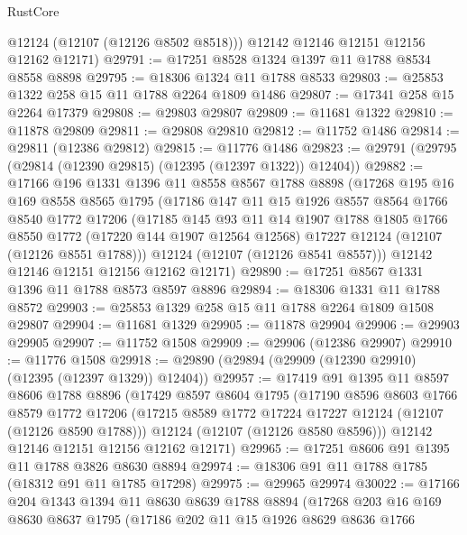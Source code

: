 \begin{lexlean}{RustCore}
\begin{coremodule}
        @12124
        (@12107 (@12126 @8502 @8518)))
      @12142
      @12146
      @12151
      @12156
      @12162
      @12171)
@29791 := @17251 @8528 @1324 @1397 @11 @1788 @8534 @8558 @8898
@29795 := @18306 @1324 @11 @1788 @8533
@29803 := @25853 @1322 @258 @15 @11 @1788 @2264 @1809 @1486
@29807 := @17341 @258 @15 @2264 @17379
@29808 := @29803 @29807
@29809 := @11681 @1322
@29810 := @11878 @29809
@29811 := @29808 @29810
@29812 := @11752 @1486
@29814 := @29811 (@12386 @29812)
@29815 := @11776 @1486
@29823 := @29791 (@29795 (@29814 (@12390 @29815) (@12395 (@12397 @1322)) @12404))
@29882 := @17166
    @196
    @1331
    @1396
    @11
    @8558
    @8567
    @1788
    @8898
    (@17268
      @195
      @16
      @169
      @8558
      @8565
      @1795
      (@17186
        @147
        @11
        @15
        @1926
        @8557
        @8564
        @1766
        @8540
        @1772
        @17206
        (@17185
          @145
          @93
          @11
          @14
          @1907
          @1788
          @1805
          @1766
          @8550
          @1772
          (@17220 @144 @1907 @12564 @12568)
          @17227
          @12124
          (@12107 (@12126 @8551 @1788)))
        @12124
        (@12107 (@12126 @8541 @8557)))
      @12142
      @12146
      @12151
      @12156
      @12162
      @12171)
@29890 := @17251 @8567 @1331 @1396 @11 @1788 @8573 @8597 @8896
@29894 := @18306 @1331 @11 @1788 @8572
@29903 := @25853 @1329 @258 @15 @11 @1788 @2264 @1809 @1508 @29807
@29904 := @11681 @1329
@29905 := @11878 @29904
@29906 := @29903 @29905
@29907 := @11752 @1508
@29909 := @29906 (@12386 @29907)
@29910 := @11776 @1508
@29918 := @29890 (@29894 (@29909 (@12390 @29910) (@12395 (@12397 @1329)) @12404))
@29957 := @17419
    @91
    @1395
    @11
    @8597
    @8606
    @1788
    @8896
    (@17429
      @8597
      @8604
      @1795
      (@17190
        @8596
        @8603
        @1766
        @8579
        @1772
        @17206
        (@17215 @8589 @1772 @17224 @17227 @12124 (@12107 (@12126 @8590 @1788)))
        @12124
        (@12107 (@12126 @8580 @8596)))
      @12142
      @12146
      @12151
      @12156
      @12162
      @12171)
@29965 := @17251 @8606 @91 @1395 @11 @1788 @3826 @8630 @8894
@29974 := @18306 @91 @11 @1788 @1785 (@18312 @91 @11 @1785 @17298)
@29975 := @29965 @29974
@30022 := @17166
    @204
    @1343
    @1394
    @11
    @8630
    @8639
    @1788
    @8894
    (@17268
      @203
      @16
      @169
      @8630
      @8637
      @1795
      (@17186
        @202
        @11
        @15
        @1926
        @8629
        @8636
        @1766

\end{coremodule}
\end{lexlean}
